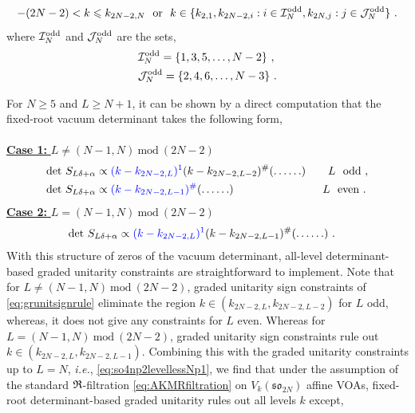 \begin{equation} \label{eq:so4np2levellessNp1}
    -(2N-2) < k \leqslant k_{2N-2,N} \ \ \text{or} \ \ k \in \{k_{2,1},k_{2N-2,i}: i \in \mathcal{I}^{\rm odd}_N, k_{2N,j}: j \in \mathcal{J}^{\rm odd}_N \}~.
\end{equation}
where $\mathcal{I}^{\rm odd}_N$ and $\mathcal{J}^{\rm odd}_N$ are the sets,
\begin{equation}
\begin{split}
    &\mathcal{I}^{\rm odd}_N = \{1, 3, 5, \ldots, N-2\}~, \\ 
    &\mathcal{J}^{\rm odd}_N = \{2, 4, 6, \ldots, N-3\}~.
\end{split}
\end{equation}

For $N \geqslant 5$ and $L \geqslant N+1$, it can be shown by a direct computation that the fixed-root vacuum determinant takes the following form, \\
\\
\underline{\textbf{Case 1: } $L \neq (N-1,N)~\text{mod}~(2N-2)$}
\begin{equation}
\begin{split}
    &\text{det}~S_{L\delta+\alpha} \propto \textcolor{blue}{(k-k_{2N-2,L})^1}(k-k_{2N-2,L-2})^{\#}( \ldots \ldots) \qquad L \ \ \text{odd}~, \\
    &\text{det}~S_{L\delta+\alpha} \propto \textcolor{blue}{(k-k_{2N-2,L-1})^{\#}}( \ldots \ldots) \qquad \qquad \qquad \qquad L \ \ \text{even}~.
\end{split}
\end{equation}
\underline{\textbf{Case 2: } $L = (N-1,N)~\text{mod}~(2N-2)$}
\begin{equation}
\begin{split}
    &\text{det}~S_{L\delta+\alpha} \propto \textcolor{blue}{(k-k_{2N-2,L})^1}(k-k_{2N-2,L-1})^{\#}( \ldots \ldots)~.
\end{split}
\end{equation}
With this structure of zeros of the vacuum determinant, all-level determinant-based graded unitarity constraints are straightforward to implement. Note that for $L \neq (N-1,N)~\text{mod}~(2N-2)$, graded unitarity sign constraints of \eqref{eq:grunitsignrule} eliminate the region $k \in (k_{2N-2, L}, k_{2N-2, L-2})$ for $L$ odd, whereas, it does not give any constraints for $L$ even. Whereas for $L = (N-1,N)~\text{mod}~(2N-2)$, graded unitarity sign constraints rule out $k \in (k_{2N-2, L}, k_{2N-2, L-1})$. Combining this with the graded unitarity constraints up to $L = N$, \emph{i.e.}, \eqref{eq:so4np2levellessNp1}, we find that under the assumption of the standard $\mathfrak{R}$-filtration \eqref{eq:AKMRfiltration} on $V_k(\mathfrak{so}_{2N})$ affine VOAs, fixed-root determinant-based graded unitarity rules out all levels $k$ except,
